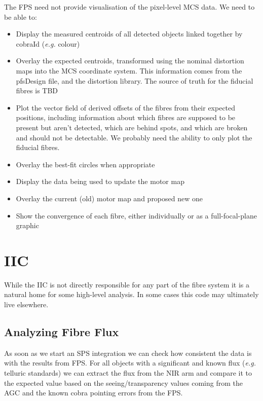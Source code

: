 \documentclass[12pt]{article}
\newcommand{\eg}{\textit{e.g.}\xspace}
\newcommand{\AGC}{\gls{AGC}\xspace}
\newcommand{\IIC}{\gls{IIC}\xspace}
\newcommand{\MCS}{\gls{MCS}\xspace}
\newcommand{\FPS}{\gls{FPS}\xspace}
\newcommand{\SPS}{\gls{SPS}\xspace}
\newcommand{\TBD}{\gls{TBD}\xspace}
\begin{document}
The \FPS need not provide visualisation of the pixel-level \MCS data.
We need to be able to:
\begin{itemize}
\item Display the measured centroids of all detected objects linked together by cobraId (\eg colour)  
\item Overlay the expected centroids, transformed using the nominal distortion maps
  into the \MCS coordinate system.
  This information comes from the \gls{pfsDesign} file, and the distortion library. The
  source of truth for the fiducial fibres is \TBD
\item Plot the vector field of derived offsets of the fibres from their expected positions,
  including information about which fibres are supposed to be present but aren't detected,
  which are behind spots, and which are broken and should not be detectable.
  We probably need the ability to only plot the fiducial fibres.
\item
  Overlay the best-fit circles when appropriate
\end{itemize}

\begin{itemize}
\item Display the data being used to update the \gls{motor map}
\item Overlay the current (old) \gls{motor map} and proposed new one
\item Show the convergence of each fibre, either individually or as a full-focal-plane graphic
\end{itemize}

\section{IIC}
\label{sec:IIC}

While the \IIC is not directly responsible for any part of the fibre system it is a natural home
for some high-level analysis.  In some cases this code may ultimately live elsewhere.

\subsection{Analyzing Fibre Flux}

As soon as we start an \SPS integration we can check how consistent the data is with the
results from \FPS.  For all objects with a significant and known flux (\eg telluric standards) we
can extract the flux from the \gls{NIR} arm and compare it to the expected value based on the
seeing/transparency values coming from the \AGC and the known cobra pointing errors from the \FPS.
\end{document}
